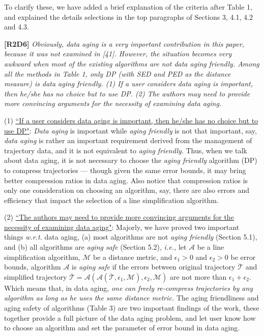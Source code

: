 \documentclass{letter}
\newcommand{\ie}{\emph{i.e.,}\xspace}
\newcommand{\wrt}{\emph{w.r.t.}\xspace}
\begin{document}
{{To clarify these, we have added a brief explanation of the criteria after Table 1, and explained the details selections in the top paragraphs of Sections 3, 4.1, 4.2 and 4.3. 

\textbf{[R2D6]} \emph{Obviously, data aging is a very important contribution in this paper, because it was not examined in [41]. However, the situation becomes very awkward when most of the existing algorithms are not data aging friendly. Among all the methods in Table 1, only DP (with SED and PED as the distance measure) is data aging friendly. (1) {If a user considers data aging is important, then he/she has no choice but to use DP}. (2) {The authors may need to provide more convincing arguments for the necessity of examining data aging}.}



(1) \underline{``If a user considers data aging is important, then he/she has no choice but to use DP"}: \emph{Data aging} is important while \emph{aging friendly} is not that important, say, \emph{data aging} is rather an important requirement derived from the management of trajectory data, and it is not equivalent to \emph{aging friendly}. Thus, when we talk about data aging, it is not necessary to choose the \emph{aging friendly} algorithm (DP) to compress trajectories --- though given the same error bounds, it may bring better compression ratios in data aging. Also notice that compression ratios is only one consideration on choosing an algorithm, say, there are also errors and efficiency that impact the selection of a line simplification algorithm.

(2) \underline{``The authors may need to provide more convincing arguments for the necessity of examining data aging"}: Majorly, we have proved two important things \wrt data aging, (a) most algorithms are not \emph{aging friendly} (Section 5.1), and (b) all algorithms are \emph{aging safe} (Section 5.2), \ie let $\mathcal{A}$ be a line simplification algorithm,  $\mathcal{M}$ be a distance metric, and $\epsilon_1>0$ and $\epsilon_2>0$ be error bounds, algorithm $\mathcal{A}$ is \emph{aging safe} if the errors between original trajectory $\dddot{\mathcal{T}}$ and simplified trajectory $\overline{\mathcal{T}}=\mathcal{A}(\mathcal{A}(\dddot{\mathcal{T}}, \epsilon_1, \mathcal{M}), \epsilon_2, \mathcal{M})$ are not more than $\epsilon_1+ \epsilon_2$. Which means that, in data aging, \emph{one can freely re-compress trajectories by any algorithm as long as he uses the same distance metric.} The aging friendliness and aging safety of algorithms (Table 3) are two important findings of the work, these together provide a full picture of the data aging problem, and let user know how to choose an algorithm and set the parameter of error bound in data aging. 

}}
\end{document}
